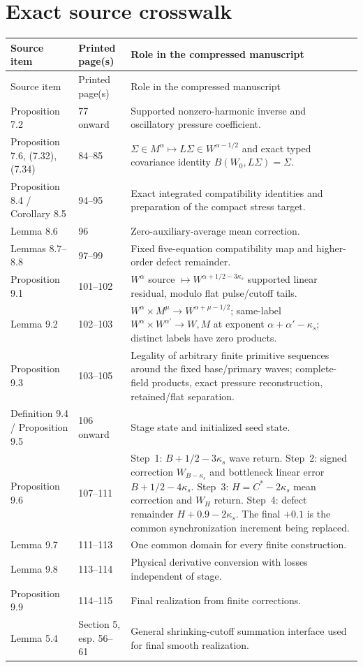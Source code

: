 \documentclass[11pt]{article}
\numberwithin{equation}{section}
\theoremstyle{highend}
\theoremstyle{definition}
\begin{document}
\section{Exact source crosswalk}\label{app:crosswalk}
\begin{longtable}{@{}p{}p{}p{}@{}}
\toprule
Source item & Printed page(s) & Role in the compressed manuscript \\
\midrule
\endfirsthead
\toprule
Source item & Printed page(s) & Role in the compressed manuscript \\
\midrule
\endhead
Proposition 7.2 & 77 onward & Supported nonzero-harmonic inverse and oscillatory pressure coefficient. \\
Proposition 7.6, (7.32), (7.34) & 84--85 & $\Sigma\in M^\alpha\mapsto L\Sigma\in W^{\alpha-1/2}$ and exact typed covariance identity $B(W_0,L\Sigma)=\Sigma$. \\
Proposition 8.4 / Corollary 8.5 & 94--95 & Exact integrated compatibility identities and preparation of the compact stress target. \\
Lemma 8.6 & 96 & Zero-auxiliary-average mean correction. \\
Lemmas 8.7--8.8 & 97--99 & Fixed five-equation compatibility map and higher-order defect remainder. \\
Proposition 9.1 & 101--102 & $W^\alpha$ source $\mapsto W^{\alpha+1/2-3\kappa_s}$ supported linear residual, modulo flat pulse/cutoff tails. \\
Lemma 9.2 & 102--103 & $W^\alpha\times M^\mu\to W^{\alpha+\mu-1/2}$; same-label $W^\alpha\times W^{\alpha'}\to W,M$ at exponent $\alpha+\alpha'-\kappa_s$; distinct labels have zero products. \\
Proposition 9.3 & 103--105 & Legality of arbitrary finite primitive sequences around the fixed base/primary waves; complete-field products, exact pressure reconstruction, retained/flat separation. \\
Definition 9.4 / Proposition 9.5 & 106 onward & Stage state and initialized seed state. \\
Proposition 9.6 & 107--111 & Step~1: $B+1/2-3\kappa_s$ wave return. Step~2: signed correction $W_{B-\kappa_s}$ and bottleneck linear error $B+1/2-4\kappa_s$. Step~3: $H=C^*-2\kappa_s$ mean correction and $W_H$ return. Step~4: defect remainder $H+0.9-2\kappa_s$. The final $+0.1$ is the common synchronization increment being replaced. \\
Lemma 9.7 & 111--113 & One common domain for every finite construction. \\
Lemma 9.8 & 113--114 & Physical derivative conversion with losses independent of stage. \\
Proposition 9.9 & 114--115 & Final realization from finite corrections. \\
Lemma 5.4 & Section 5, esp. 56--61 & General shrinking-cutoff summation interface used for final smooth realization. \\
\bottomrule
\end{longtable}
\end{document}
